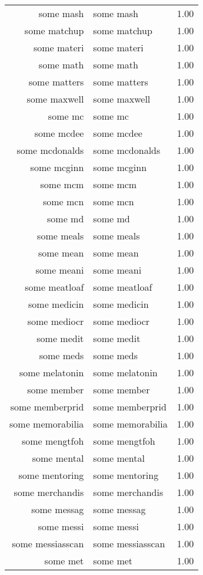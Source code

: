 \begin{table}[ht]
\begin{tabular}{rlr}
  some mash & some mash & 1.00 \\ 
  some matchup & some matchup & 1.00 \\ 
  some materi & some materi & 1.00 \\ 
  some math & some math & 1.00 \\ 
  some matters & some matters & 1.00 \\ 
  some maxwell & some maxwell & 1.00 \\ 
  some mc & some mc & 1.00 \\ 
  some mcdee & some mcdee & 1.00 \\ 
  some mcdonalds & some mcdonalds & 1.00 \\ 
  some mcginn & some mcginn & 1.00 \\ 
  some mcm & some mcm & 1.00 \\ 
  some mcn & some mcn & 1.00 \\ 
  some md & some md & 1.00 \\ 
  some meals & some meals & 1.00 \\ 
  some mean & some mean & 1.00 \\ 
  some meani & some meani & 1.00 \\ 
  some meatloaf & some meatloaf & 1.00 \\ 
  some medicin & some medicin & 1.00 \\ 
  some mediocr & some mediocr & 1.00 \\ 
  some medit & some medit & 1.00 \\ 
  some meds & some meds & 1.00 \\ 
  some melatonin & some melatonin & 1.00 \\ 
  some member & some member & 1.00 \\ 
  some memberprid & some memberprid & 1.00 \\ 
  some memorabilia & some memorabilia & 1.00 \\ 
  some mengtfoh & some mengtfoh & 1.00 \\ 
  some mental & some mental & 1.00 \\ 
  some mentoring & some mentoring & 1.00 \\ 
  some merchandis & some merchandis & 1.00 \\ 
  some messag & some messag & 1.00 \\ 
  some messi & some messi & 1.00 \\ 
  some messiasscan & some messiasscan & 1.00 \\ 
  some met & some met & 1.00 \\ 

\end{tabular}
\end{table}
